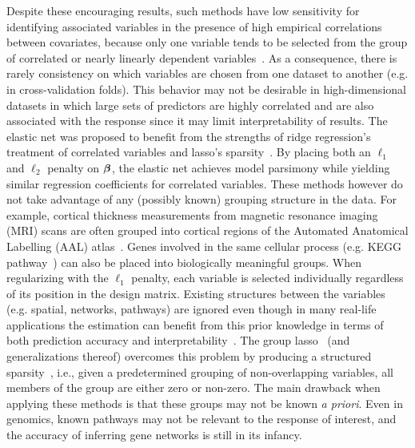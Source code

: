 Despite these encouraging results, such methods have low sensitivity for identifying associated variables in the presence of high empirical correlations between covariates, because only one variable tends to be selected from the group of correlated or nearly linearly dependent variables~\citep{buhlmann2013correlated}. 
As a consequence, there is rarely consistency on which variables are chosen from one dataset to another (e.g. in cross-validation folds). This behavior may not be desirable in high-dimensional datasets in which large sets of predictors are highly correlated and are also associated with the response since it may limit interpretability of results. 
The elastic net was proposed to benefit from the strengths of ridge regression's treatment of correlated variables and lasso's sparsity~\citep{zou2005regularization}. 
By placing both an $\ell_1$ and $\ell_2$ penalty on $\boldsymbol{\beta}$, the elastic net achieves model parsimony while yielding similar regression coefficients for correlated variables. 
These methods however do not take advantage of any (possibly known) grouping structure in the data. For example, cortical thickness measurements from magnetic resonance imaging (MRI) scans are often grouped into cortical regions of the Automated Anatomical Labelling (AAL) atlas~\citep{tzourio2002automated}. 
Genes involved in the same cellular process (e.g. KEGG pathway~\citep{kanehisa2008kegg}) can also be placed into biologically meaningful groups. When regularizing with the $\ell_1$ penalty, each variable is selected individually regardless of its position in the design matrix. 
Existing structures between the variables (e.g. spatial, networks, pathways) are ignored even though in many real-life applications the estimation can benefit from this prior knowledge in terms of both prediction accuracy and interpretability~\citep{bach2012structured}. 
The group lasso~\citep{yuan2006model} (and generalizations thereof) overcomes this problem by producing a structured sparsity~\citep{bach2012structured}, i.e., given a predetermined grouping of non-overlapping variables, all members of the group are either zero or non-zero. 
The main drawback when applying these methods is that these groups may not be known \textit{a priori}. Even in genomics, known pathways may not be relevant to the response of interest, and the accuracy of inferring gene networks is still in its infancy. 




